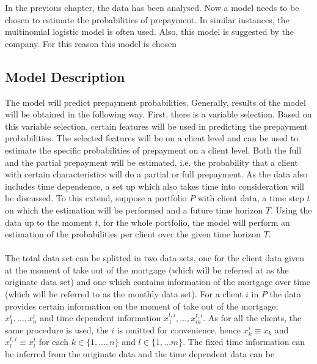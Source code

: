 In the previous chapter, the data has been analysed. Now a model needs 
to be chosen to estimate the probabilities of prepayment. In similar 
instances, the multinomial logistic model is often used. Also, this 
model is suggested by the company. For this reason this model is 
chosen 

\subsection{Model Description}
    The model will predict prepayment probabilities. 
    Generally, results of the model will be obtained in the following 
    way. 
    First, there is a variable selection. Based on this variable
    selection, certain features will be used in predicting the prepayment  
    probabilities. The selected features will be on a client level and 
    can be used to estimate the specific probabilities of prepayment 
    on a client level. Both the full and the partial prepayment will 
    be estimated, i.e. the probability that a client with certain 
    characteristics will do a partial or full prepayment. 
    As the data also includes time dependence, a set up which also 
    takes time into consideration will be discussed. To this extend, 
    suppose a portfolio $P$ with client data, a time step $t$ on 
    which the estimation will be performed and a future time horizon $T$. 
    Using the data up to the moment $t$, for the whole portfolio, 
    the model will perform an estimation of the probabilities per 
    client over the given time horizon $T$. 
    \\\\ 
    The total data set can be splitted in two data sets, one for the 
    client data given at the moment of take out of the mortgage 
    (which will be referred at as
    the originate data set) and one which contains information of 
    the mortgage over time (which will be referred to as the monthly 
    data set). For a client $i$ in $P$ the data provides certain 
    information on the moment of take out of the mortgage; 
    $x_1^i, \ldots, x_n^i$ and time dependent information $x_1^{t, i}, 
    \ldots, x_m^{t, i}$. As for all the clients, the same procedure 
    is used, the $i$ is omitted for convenience, hence 
    $x_k^i \equiv x_k$ and $x_l^{t, i} \equiv x_l^t$ for each 
    $k \in \{1, \ldots, n\}$ and $l \in \{1, 
    \ldots m \}$.  The fixed time information can be inferred
    from the originate data and the time dependent data can be 
